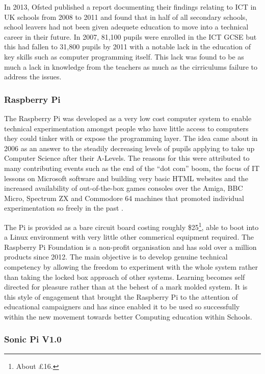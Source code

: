\documentclass[11pt, abstracton, twoside, titlepage=true]{scrartcl}
\begin{document}
In 2013, Ofsted published a report documenting their findings relating to ICT 
in UK schools from 2008 to 2011 and found that in half of all secondary 
schools, school leavers had not been given adequete education to move into a 
technical career in their future. In 2007, 81,100 pupils were enrolled in the 
ICT GCSE but this had fallen to 31,800 pupils by 2011 \cite{DfEO13} with a 
notable lack in the education of key skills such as computer programming 
itself. This lack was found to be as much a lack in knowledge from the 
teachers as much as the cirriculums failure to address the issues.

\subsubsection{Raspberry Pi}
The Raspberry Pi was developed as a very low cost computer system to enable 
technical experimentation amongst people who have little access to computers 
they could tinker with or expose the programming layer. The idea came about in 
2006 as an answer to the steadily decreasing levels of pupils applying to take 
up Computer Science after their A-Levels. The reasons for this were attributed 
to many contributing events such as the end of the ``dot com'' boom, the focus 
of IT lessons on Microsoft software and building very basic HTML websites and 
the increased availability of out-of-the-box games consoles over the Amiga, BBC 
Micro, Spectrum ZX and Commodore 64 machines that promoted individual 
experimentation so freely in the past \cite{rp}.

The Pi is provided as a bare circuit board costing roughly \$25\footnote{About 
\pounds16.}, able to boot 
into a Linux environment with very little other commerical equipment required. 
The Raspberry Pi Foundation is a non-profit organisation and has sold over a 
million products since 2012. The main objective is to develop genuine 
technical competency by allowing the freedom to experiment with the whole 
system rather than taking the locked box approach of other systems. Learning 
becomes self directed for pleasure rather than at the behest of a mark molded 
system. It is this style of engagement that brought the Raspberry Pi to the 
attention of educational campaigners and has since enabled it to be used so 
successfully within the new movement towards better Computing education within 
Schools. 

\subsubsection{Sonic Pi V1.0}
\end{document}

